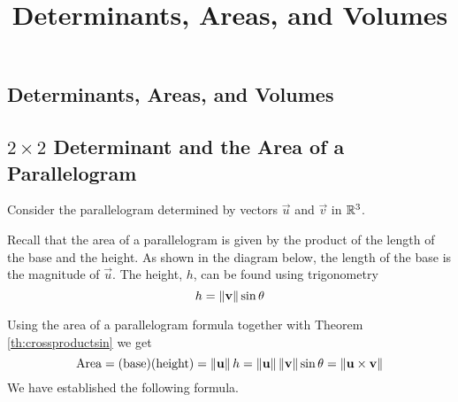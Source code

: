 \documentclass{ximera}
\title{Determinants, Areas, and Volumes} \license{CC BY-NC-SA 4.0}
\begin{document}
\begin{abstract}
 \end{abstract}
\maketitle

\begin{onlineOnly}
\section*{Determinants, Areas, and Volumes}
\end{onlineOnly}

\subsection*{$2\times 2$ Determinant and the Area of a Parallelogram}

Consider the parallelogram determined by vectors $\vec{u}$ and $\vec{v}$ in $\mathbb{R}^3$.

\begin{center}
\end{center}

Recall that the area of a parallelogram is given by the product of the length of the base and the height.
As shown in the diagram below, the length of the base is the magnitude of $\vec{u}$. The height, $h$, can be found using trigonometry $$h=\left\lVert\mathbf{v}\right\rVert\sin\theta$$ 
\begin{center}
\end{center}
Using the area of a parallelogram formula together with Theorem \ref{th:crossproductsin} we get
$$\mbox{Area}=(\text{base})(\text{height})=\left\lVert\mathbf{u}\right\rVert h=\left\lVert\mathbf{u}\right\rVert\left\lVert\mathbf{v}\right\rVert\sin\theta=\left\lVert\mathbf{u}\times\mathbf{v}\right\rVert$$
We have established the following formula.
\end{document}
